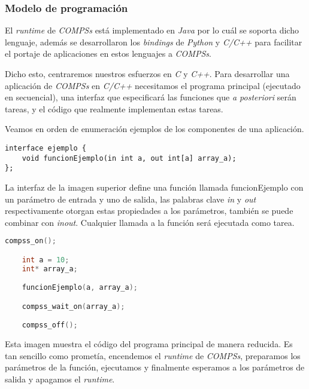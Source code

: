\subsubsection{Modelo de programación} 
\label{compss_pm}

El \textit{runtime} de \textit{COMPSs} está implementado en \textit{Java} por lo cuál se soporta dicho lenguaje, además se desarrollaron los \textit{bindings} de \textit{Python}\cite{tejedor2017pycompss} y \textit{C/C++} para facilitar el portaje de aplicaciones en estos lenguajes a \textit{COMPSs}. 
\par\bigskip

Dicho esto, centraremos nuestros esfuerzos en \textit{C} y \textit{C++}. Para desarrollar una aplicación de \textit{COMPSs} en \textit{C/C++} necesitamos el programa principal (ejecutado en secuencial), una interfaz que especificará las funciones que \textit{a posteriori} serán tareas, y el código que realmente implementan estas tareas. 
\par\bigskip

Veamos en orden de enumeración ejemplos de los componentes de una aplicación.

\begin{lstlisting}[caption={Interfaz de la aplicación 'ejemplo'.},captionpos=b, label={lst:ejemplo.idl}, style=idlstyle]
interface ejemplo {
    void funcionEjemplo(in int a, out int[a] array_a);
};
\end{lstlisting}

La interfaz de la imagen superior define una función llamada funcionEjemplo con un parámetro de entrada y uno de salida, las palabras clave \textit{in} y \textit{out} respectivamente otorgan estas propiedades a los parámetros, también se puede combinar con \textit{inout}. Cualquier llamada a la función será ejecutada como tarea.\smallskip

\begin{lstlisting}[caption={Fracción del código del programa principal}, captionpos=b, label={lst:ejemplo.cc}, language=C++]
    compss_on();

    int a = 10;
    int* array_a;

    funcionEjemplo(a, array_a);

    compss_wait_on(array_a);

    compss_off();
\end{lstlisting}

Esta imagen muestra el código del programa principal de manera reducida. Es tan sencillo como prometía, encendemos el \textit{runtime} de \textit{COMPSs}, preparamos los parámetros de la función, ejecutamos y finalmente esperamos a los parámetros de salida y apagamos el \textit{runtime}. \smallskip

